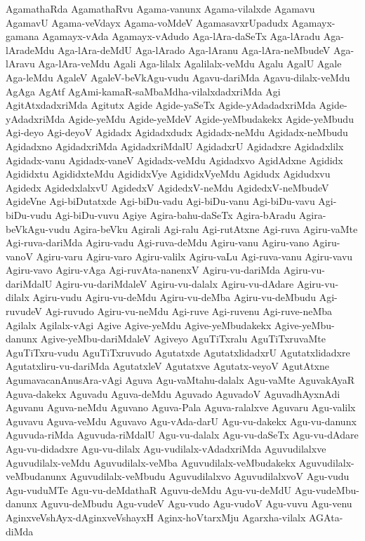 {AgamathaRda
AgamathaRvu
Agama-vanunx
Agama-vilalxde
Agamavu
AgamavU
Agama-veVdayx
Agama-voMdeV
AgamasavxrUpadudx
Agamayx-gamana
Agamayx-vAda
Agamayx-vAdudo
Aga-lAra-daSeTx
Aga-lAradu
Aga-lAradeMdu
Aga-lAra-deMdU
Aga-lArado
Aga-lAranu
Aga-lAra-neMbudeV
Aga-lAravu
Aga-lAra-veMdu
Agali
Aga-lilalx
Agalilalx-veMdu
Agalu
AgalU
Agale
Aga-leMdu
AgaleV
AgaleV-beVkAgu-vudu
Agavu-dariMda
Agavu-dilalx-veMdu
AgAga
AgAtf
AgAmi-kamaR-saMbaMdha-vilalxdadxriMda
Agi
AgitAtxdadxriMda
Agitutx
Agide
Agide-yaSeTx
Agide-yAdadadxriMda
Agide-yAdadxriMda
Agide-yeMdu
Agide-yeMdeV
Agide-yeMbudakekx
Agide-yeMbudu
Agi-deyo
Agi-deyoV
Agidadx
Agidadxdudx
Agidadx-neMdu
Agidadx-neMbudu
Agidadxno
AgidadxriMda
AgidadxriMdalU
AgidadxrU
Agidadxre
Agidadxlilx
Agidadx-vanu
Agidadx-vaneV
Agidadx-veMdu
Agidadxvo
AgidAdxne
Agididx
Agididxtu
AgididxteMdu
AgididxVye
AgididxVyeMdu
Agidudx
Agidudxvu
Agidedx
AgidedxlalxvU
AgidedxV
AgidedxV-neMdu
AgidedxV-neMbudeV
AgideVne
Agi-biDutatxde
Agi-biDu-vadu
Agi-biDu-vanu
Agi-biDu-vavu
Agi-biDu-vudu
Agi-biDu-vuvu
Agiye
Agira-bahu-daSeTx
Agira-bAradu
Agira-beVkAgu-vudu
Agira-beVku
Agirali
Agi-ralu
Agi-rutAtxne
Agi-ruva
Agiru-vaMte
Agi-ruva-dariMda
Agiru-vadu
Agi-ruva-deMdu
Agiru-vanu
Agiru-vano
Agiru-vanoV
Agiru-varu
Agiru-varo
Agiru-valilx
Agiru-vaLu
Agi-ruva-vanu
Agiru-vavu
Agiru-vavo
Agiru-vAga
Agi-ruvAta-nanenxV
Agiru-vu-dariMda
Agiru-vu-dariMdalU
Agiru-vu-dariMdaleV
Agiru-vu-dalalx
Agiru-vu-dAdare
Agiru-vu-dilalx
Agiru-vudu
Agiru-vu-deMdu
Agiru-vu-deMba
Agiru-vu-deMbudu
Agi-ruvudeV
Agi-ruvudo
Agiru-vu-neMdu
Agi-ruve
Agi-ruvenu
Agi-ruve-neMba
Agilalx
Agilalx-vAgi
Agive
Agive-yeMdu
Agive-yeMbudakekx
Agive-yeMbu-danunx
Agive-yeMbu-dariMdaleV
Agiveyo
AguTiTxralu
AguTiTxruvaMte
AguTiTxru-vudu
AguTiTxruvudo
Agutatxde
AgutatxlidadxrU
Agutatxlidadxre
Agutatxliru-vu-dariMda
AgutatxleV
Agutatxve
Agutatx-veyoV
AgutAtxne
AgumavacanAnusAra-vAgi
Aguva
Agu-vaMtahu-dalalx
Agu-vaMte
AguvakAyaR
Aguva-dakekx
Aguvadu
Aguva-deMdu
Aguvado
AguvadoV
AguvadhAyxnAdi
Aguvanu
Aguva-neMdu
Aguvano
Aguva-Pala
Aguva-ralalxve
Aguvaru
Agu-valilx
Aguvavu
Aguva-veMdu
Aguvavo
Agu-vAda-darU
Agu-vu-dakekx
Agu-vu-danunx
Aguvuda-riMda
Aguvuda-riMdalU
Agu-vu-dalalx
Agu-vu-daSeTx
Agu-vu-dAdare
Agu-vu-didadxre
Agu-vu-dilalx
Agu-vudilalx-vAdadxriMda
Aguvudilalxve
Aguvudilalx-veMdu
Aguvudilalx-veMba
Aguvudilalx-veMbudakekx
Aguvudilalx-veMbudanunx
Aguvudilalx-veMbudu
Aguvudilalxvo
AguvudilalxvoV
Agu-vudu
Agu-vuduMTe
Agu-vu-deMdathaR
Aguvu-deMdu
Agu-vu-deMdU
Agu-vudeMbu-danunx
Aguvu-deMbudu
Agu-vudeV
Agu-vudo
Agu-vudoV
Agu-vuvu
Agu-venu
AginxveVshAyx-dAginxveVshayxH
Aginx-hoVtarxMju
Agarxha-vilalx
AGAta-diMda
}
